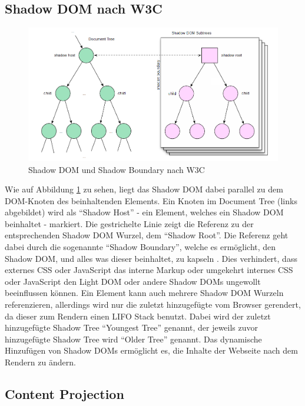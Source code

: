 \subsection{Shadow DOM nach W3C}\label{shadow-dom-nach-w3c}

\begin{figure}[htbp]
 \centering
 \includegraphics[width=\linewidth]{kapitel2/bilder/3-shadow-dom-shadow-boundary}
 \caption{Shadow \ac{DOM} und Shadow Boundary nach W3C}
 \label{fig:sdsbnw3c}
\end{figure}

Wie auf Abbildung \ref{fig:sdsbnw3c} zu sehen, liegt das Shadow \ac{DOM} dabei parallel zu dem \ac{DOM}-Knoten des beinhaltenden Elements. Ein Knoten im Document Tree (links abgebildet) wird als ``Shadow Host'' - ein Element, welches ein Shadow \ac{DOM} beinhaltet - markiert. Die gestrichelte Linie zeigt die Referenz zu der entsprechenden Shadow \ac{DOM} Wurzel, dem ``Shadow Root''. Die Referenz geht dabei durch die sogenannte ``Shadow Boundary'', welche es ermöglicht, den Shadow \ac{DOM}, und alles was dieser beinhaltet, zu kapseln \cite{citeulike:13851350}. Dies verhindert, dass externes \ac{CSS} oder JavaScript das interne Markup oder umgekehrt internes \ac{CSS} oder JavaScript den Light \ac{DOM} oder andere Shadow \ac{DOM}s ungewollt beeinflussen können. Ein Element kann auch mehrere Shadow \ac{DOM} Wurzeln referenzieren, allerdings wird nur die zuletzt hinzugefügte vom Browser gerendert, da dieser zum Rendern einen \ac{LIFO} Stack benutzt. Dabei wird der zuletzt hinzugefügte Shadow Tree ``Youngest Tree'' genannt, der jeweils zuvor hinzugefügte Shadow Tree wird ``Older Tree'' genannt. Das dynamische Hinzufügen von Shadow \ac{DOM}s ermöglicht es, die Inhalte der Webseite nach dem Rendern zu ändern.


\subsection{Content Projection}\label{content-projection}

